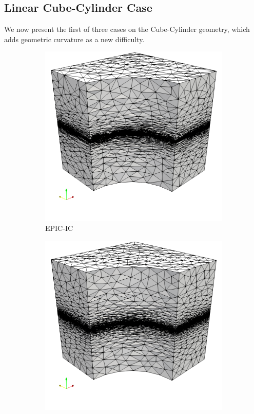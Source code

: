 \documentclass[3p,times,procedia,number]{elsarticle}
\begin{document}
\subsection{Linear Cube-Cylinder Case}

We now present the first of three cases on the Cube-Cylinder geometry,
which adds geometric curvature as a new difficulty.

\begin{figure}
\begin{subfigure}{.24\textwidth}
\centering
\includegraphics[width=\textwidth]{epic-ic-cube-cylinder-linear.png}
\caption{EPIC-IC}
\end{subfigure}
\begin{subfigure}{.24\textwidth}
\centering
\includegraphics[width=\textwidth]{epic-ics-cube-cylinder-linear.png}

\end{subfigure}
\end{figure}
\end{document}
